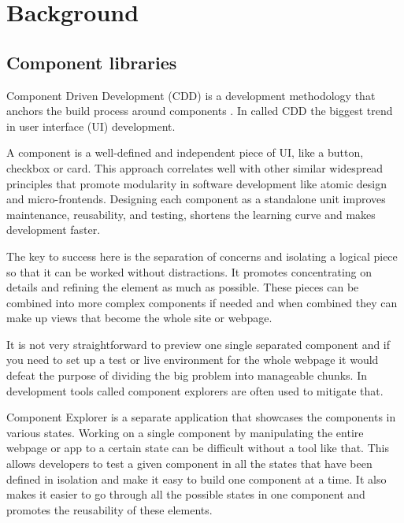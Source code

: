 \documentclass{master_thesis}
\begin{document}
\section{Background}



\subsection{Component libraries}

Component Driven Development (CDD) is a development methodology that anchors the build process around components \citep{Coleman2017}. In \citeyear{Coleman2017} \citeauthor{Coleman2017} called CDD the biggest trend in user interface (UI) development.

A component is a well-defined and independent piece of UI, like a button, checkbox or card. This approach correlates well with other similar widespread principles that promote modularity in software development like atomic design and micro-frontends. Designing each component as a standalone unit improves maintenance, reusability, and testing, shortens the learning curve and makes development faster. \citep{Ella2019}

The key to success here is the separation of concerns and isolating a logical piece so that it can be worked without distractions. It promotes concentrating on details and refining the element as much as possible. These pieces can be combined into more complex components if needed and when combined they can make up views that become the whole site or webpage.

It is not very straightforward to preview one single separated component and if you need to set up a test or live environment for the whole webpage it would defeat the purpose of dividing the big problem into manageable chunks. In development tools called component explorers are often used to mitigate that.

Component Explorer is a separate application that showcases the components in various states. Working on a single component by manipulating the entire webpage or app to a certain state can be difficult without a tool like that. This allows developers to test a given component in all the states that have been defined in isolation and make it easy to build one component at a time. It also makes it easier to go through all the possible states in one component and promotes the reusability of these elements. \citep{Coleman2017}
\end{document}
